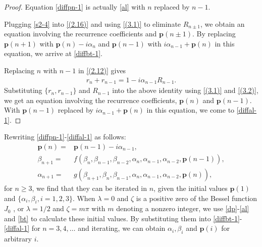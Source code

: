 \documentclass[11pt,a4paper]{article}
\numberwithin{equation}{section}
\begin{document}
	\begin{proof}
Equation \eqref{diffpn-1} is actually  \eqref{al} with $n$ replaced by $n-1$.

Plugging \eqref{s2-4} into \eqref{(2.16)} and using \eqref{(3.1)} to eliminate $R_{n\pm1}$, we obtain an equation involving the recurrence coefficients and $ \textbf{p}(n\pm1)$. By replacing $\textbf{p}(n+1)$ with  $\textbf{p}(n)-\mathit{i}\alpha_{n}$ and $\textbf{p}(n-1)$ with $\mathit{i}\alpha_{n-1}+\textbf{p}(n)$ in this equation, we arrive at \eqref{diffbt-1}.

Replacing $n$ with $n-1$ in \eqref{(2.12)} gives
		\begin{align*}
			 r_{n}+r_{n-1}=1-\mathit{i}\alpha_{n-1}R_{n-1}.
		\end{align*}	
Substituting $\{r_{n},r_{n-1}\}$ and $R_{n-1}$ into the above identity using \eqref{(3.1)} and \eqref{(3.2)}, we get an equation involving the recurrence coefficients, $\textbf{p}(n)$ and $\textbf{p}(n-1)$. With $\textbf{p}(n-1)$ replaced by $\mathit{i}\alpha_{n-1}+\textbf{p}(n)$ in this equation, we come to \eqref{diffal-1}.
	\end{proof}

Rewriting \eqref{diffpn-1}-\eqref{diffal-1} as follows:
\begin{align*}
 \textbf{p}(n)=&\textbf{p}(n-1)-\mathit{i}\alpha_{n-1},\\
\beta_{n+1}=&f\left(\beta_n,\beta_{n-1},\beta_{n-2}, \alpha_n,\alpha_{n-1},\alpha_{n-2},\textbf{p}(n-1)\right),\\ \alpha_{n+1}=&g\left(\beta_{n+1},\beta_n, \beta_{n-1}, \alpha_n,\alpha_{n-1}, \alpha_{n-2}, \textbf{p}(n)\right),
 \end{align*}
for $n\geq3$, we find that they can be iterated in $n$, given the initial values $\textbf{p}(1)$ and $\{\alpha_i, \beta_i,i=1,2,3\}$. When $\lambda=0$ and $\zeta$ is a positive zero of the Bessel function $J_0$ , or $\lambda=1/2$ and $\zeta=m\pi$ with $m$ denoting a nonzero integer, we use \eqref{dp}-\eqref{al} and \eqref{bt} to calculate these initial values. By substituting them into \eqref{diffbt-1}-\eqref{diffal-1}  for $n=3,4,\dots$ and iterating, we can obtain $\alpha_{i},\beta_i$ and $\textbf{p}(i)$ for arbitrary $i$.
\end{document}
